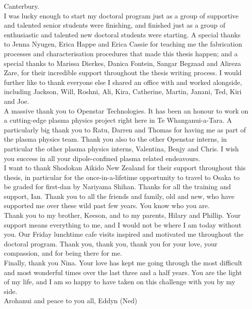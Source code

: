 \documentclass[
  a4paper,
]{scrbook}
\begin{document}
Canterbury. \\[5pt] I was lucky enough to start my doctoral program just as a group of supportive and talented senior students were finishing, and finished just as a group of enthusiastic and talented new doctoral students were starting. A special thanks to Jenna Nyugen, Erica Happe and Erica Cassie for teaching me the fabrication processes and characterisation procedures that made this thesis happen; and a special thanks to Marissa Dierkes, Danica Fontein, Sangar Begzaad and Alireza Zare, for their incredible support throughout the thesis writing process. I would further like to thank everyone else I shared an office with and worked alongside, including Jackson, Will, Roshni, Ali, Kira, Catherine, Martin, Janani, Ted, Kiri and Joe. \\[5pt] A massive thank you to Openstar Technologies. It has been an honour to work on a cutting-edge plasma physics project right here in Te Whanganui-a-Tara. A particularly big thank you to Ratu, Darren and Thomas for having me as part of the plasma physics team. Thank you also to the other Openstar interns, in particular the other plasma physics interns, Valentina, Benjy and Chris. I wish you success in all your dipole-confined plasma related endeavours. \\[5pt] I want to thank Shodokan Aikido New Zealand for their support throughout this thesis, in particular for the once-in-a-lifetime opportunity to travel to Osaka to be graded for first-dan by Nariyama Shihan. Thanks for all the training and support, Ian. Thank you to all the friends and family, old and new, who have supported me over these wild past few years. You know who you are. \\[5pt] Thank you to my brother, Keeson, and to my parents, Hilary and Phillip. Your support means everything to me, and I would not be where I am today without you. Our Friday lunchtime cafe visits inspired and motivated me throughout the doctoral program. Thank you, thank you, thank you for your love, your compassion, and for being there for me. \\[5pt] Finally, thank you Nina. Your love has kept me going through the most difficult and most wonderful times over the last three and a half years. You are the light of my life, and I am so happy to have taken on this challenge with you by my side. \\[5pt] Arohanui and peace to you all, Eddyn (Ned)

\fancyhf{} %
\thispagestyle{fancy} %
\renewcommand{\headrulewidth}{0pt}
\fancyfoot[R]{\thepage} %
\end{document}
